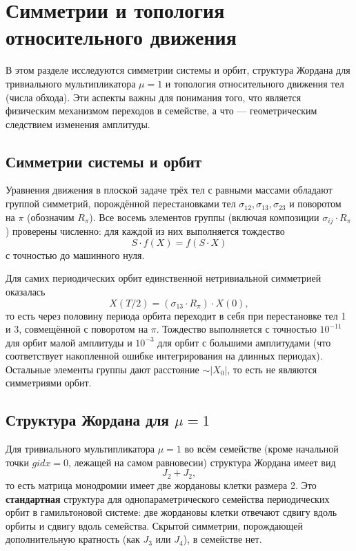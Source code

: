 \section{Симметрии и топология относительного движения}

В этом разделе исследуются симметрии системы и орбит, структура Жордана для тривиального мультипликатора \(\mu=1\) и топология относительного движения тел (числа обхода). Эти аспекты важны для понимания того, что является физическим механизмом переходов в семействе, а что — геометрическим следствием изменения амплитуды.

\subsection{Симметрии системы и орбит}
Уравнения движения в плоской задаче трёх тел с равными массами обладают группой симметрий, порождённой перестановками тел \(\sigma_{12}, \sigma_{13}, \sigma_{23}\) и поворотом на \(\pi\) (обозначим \(R_\pi\)). Все восемь элементов группы (включая композиции \(\sigma_{ij} \cdot R_\pi\)) проверены численно: для каждой из них выполняется тождество
\begin{equation}
    S \cdot f(X) = f(S \cdot X)
\end{equation}
с точностью до машинного нуля.

Для самих периодических орбит единственной нетривиальной симметрией оказалась
\begin{equation}
    X(T/2) = (\sigma_{13} \cdot R_\pi) \cdot X(0),
\end{equation}
то есть через половину периода орбита переходит в себя при перестановке тел 1 и 3, совмещённой с поворотом на \(\pi\). Тождество выполняется с точностью \(10^{-11}\) для орбит малой амплитуды и \(10^{-3}\) для орбит с большими амплитудами (что соответствует накопленной ошибке интегрирования на длинных периодах). Остальные элементы группы дают расстояние \(\sim |X_0|\), то есть не являются симметриями орбит.

\subsection{Структура Жордана для \(\mu=1\)}
Для тривиального мультипликатора \(\mu=1\) во всём семействе (кроме начальной точки \(gidx=0\), лежащей на самом равновесии) структура Жордана имеет вид
\begin{equation}
    J_2 + J_2,
\end{equation}
то есть матрица монодромии имеет две жордановы клетки размера 2. Это \textbf{стандартная} структура для однопараметрического семейства периодических орбит в гамильтоновой системе: две жордановы клетки отвечают сдвигу вдоль орбиты и сдвигу вдоль семейства. Скрытой симметрии, порождающей дополнительную кратность (как \(J_3\) или \(J_4\)), в семействе нет.

